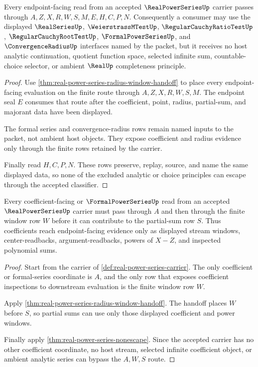 \begin{theorem}\label{thm:real-power-series-nonescape}
Every endpoint-facing read from an accepted $\RealPowerSeriesUp$ carrier passes through $A,Z,X,R,W,S,M,E,H,C,P,N$. Consequently a consumer may use the displayed $\RealSeriesUp$, $\WeierstrassMTestUp$, $\RegularCauchyRatioTestUp$, $\RegularCauchyRootTestUp$, $\FormalPowerSeriesUp$, and $\ConvergenceRadiusUp$ interfaces named by the packet, but it receives no host analytic continuation, quotient function space, selected infinite sum, countable-choice selector, or ambient $\RealUp$ completeness principle.
\end{theorem}
\begin{proof}
Use \autoref{thm:real-power-series-radius-window-handoff} to place every endpoint-facing evaluation on the finite route through $A,Z,X,R,W,S,M$. The endpoint seal $E$ consumes that route after the coefficient, point, radius, partial-sum, and majorant data have been displayed.

The formal series and convergence-radius rows remain named inputs to the packet, not ambient host objects. They expose coefficient and radius evidence only through the finite rows retained by the carrier.

Finally read $H,C,P,N$. These rows preserve, replay, source, and name the same displayed data, so none of the excluded analytic or choice principles can escape through the accepted classifier.
\end{proof}

\begin{theorem}\label{thm:real-power-series-coefficient-window-ledger}
Every coefficient-facing or $\FormalPowerSeriesUp$ read from an accepted $\RealPowerSeriesUp$ carrier must pass through $A$ and then through the finite window row $W$ before it can contribute to the partial-sum row $S$. Thus coefficients reach endpoint-facing evidence only as displayed stream windows, center-readbacks, argument-readbacks, powers of $X-Z$, and inspected polynomial sums.
\end{theorem}
\begin{proof}
Start from the carrier of \autoref{def:real-power-series-carrier}. The only coefficient or formal-series coordinate is $A$, and the only row that exposes coefficient inspections to downstream evaluation is the finite window row $W$.

Apply \autoref{thm:real-power-series-radius-window-handoff}. The handoff places $W$ before $S$, so partial sums can use only those displayed coefficient and power windows.

Finally apply \autoref{thm:real-power-series-nonescape}. Since the accepted carrier has no other coefficient coordinate, no host stream, selected infinite coefficient object, or ambient analytic series can bypass the $A,W,S$ route.
\end{proof}

